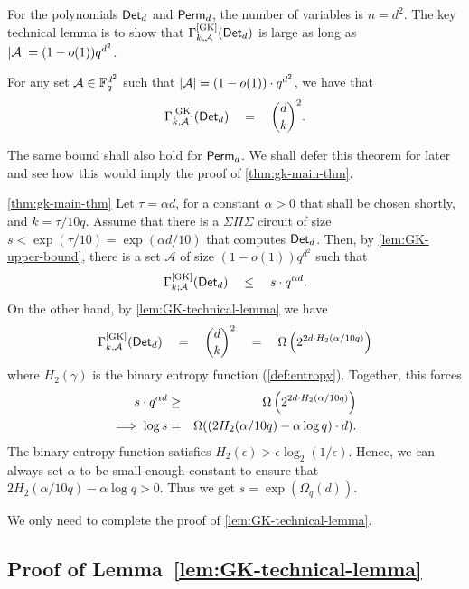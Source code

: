 For the polynomials $\operatorname{\mathsf{Det}}_d$ and $\operatorname{\mathsf{Perm}}_d$, the number of variables is $n = d^2$. 
The key technical lemma is to show that
$\Gamma^{\mathrm{[GK]}}_{k,\mathcal{A}}(\operatorname{\mathsf{Det}}_d)$ is large as long as
$\left|\mathcal{A}\right| = (1 - o(1)) q^{d^2}$.

\begin{lemma}\label{lem:GK-technical-lemma}
  For any set $\mathcal{A} \in \mathbb{F}_q^{d^2}$ such that
  $\left|\mathcal{A}\right| = (1 - o(1)) \cdot q^{d^2}$, we have that
  \[
  \Gamma^{\mathrm{[GK]}}_{k,\mathcal{A}}(\operatorname{\mathsf{Det}}_d) \quad = \quad  \binom{d}{k}^2.
  \]
\end{lemma}

The same bound shall also hold for $\operatorname{\mathsf{Perm}}_d$. 
We shall defer this
theorem for later and see how this would imply the proof of
\autoref{thm:gk-main-thm}.

\begin{proofof}{\autoref{thm:gk-main-thm}}
  Let $\tau = \alpha d$, for a constant $\alpha > 0$ that shall be chosen shortly,  and $k = \tau/10q$. 
  Assume that there is a $\Sigma\Pi\Sigma$ circuit of size  $s < \exp(\tau/10) = \exp(\alpha d / 10)$ that computes $\operatorname{\mathsf{Det}}_d$. 
  Then, by \autoref{lem:GK-upper-bound}, there is a set $\mathcal{A}$ of size $(1 - o(1)) q^{d^2}$ such that 
  \[
  \Gamma^{\mathrm{[GK]}}_{k;\mathcal{A}}(\operatorname{\mathsf{Det}}_d) \quad \leq \quad s \cdot  q^{\alpha d}.
  \]
  On the other hand, by \autoref{lem:GK-technical-lemma} we have
  \[
  \Gamma^{\mathrm{[GK]}}_{k,\mathcal{A}}(\operatorname{\mathsf{Det}}_d) \quad = \quad  \binom{d}{k}^2 \quad = \quad \Omega\left(2^{2d \cdot H_2(\alpha/10q)}\right)
  \]
  where $H_2(\gamma)$ is the binary entropy function (\autoref{def:entropy}). 
  Together, this forces 
  \begin{eqnarray*}
    s \cdot q^{\alpha d}  & \geq & \Omega\left(2^{2d \cdot H_2(\alpha/10q)}\right)\\
    \implies \log s & = & \Omega((2H_2(\alpha/10q) - \alpha \log q) \cdot d).
  \end{eqnarray*}
  The binary entropy function satisfies $H_2(\epsilon) > \epsilon \log_2(1/\epsilon)$. Hence, we can always set $\alpha$ to be small enough constant to ensure that $2H_2(\alpha/10q) - \alpha \log q > 0$. 
Thus we get $s =  \exp(\Omega_q(d))$. 
\end{proofof}

\noindent
We only need to complete the proof of \autoref{lem:GK-technical-lemma}. 

\subsection{Proof of Lemma~\ref{lem:GK-technical-lemma} {} }

